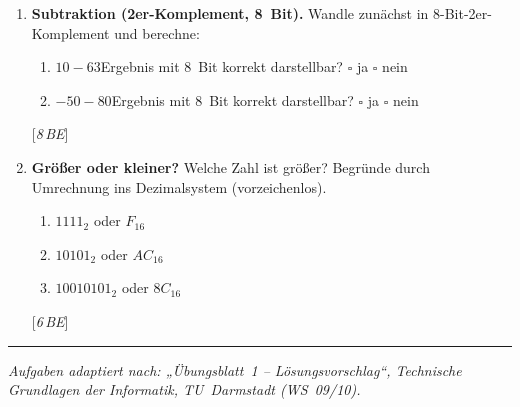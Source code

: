 \documentclass[11pt,a4paper]{scrartcl}
\newenvironment{aufgaben}{%
  \begin{enumerate}[leftmargin=*,label=\textbf{Aufgabe~\arabic*:}, itemsep=0.6em]
}{\end{enumerate}}
\newcommand{\punkte}[1]{\hfill{\small[\textit{#1\,BE}]}}
\begin{document}
\begin{aufgaben}
  \item \textbf{Subtraktion (2er-Komplement, 8~Bit).} Wandle zunächst in 8-Bit-2er-Komplement und berechne:
  \begin{enumerate}[label*=\alph*)]
    \item \(10 - 63\)\quad Ergebnis mit 8~Bit korrekt darstellbar? \(\square\) ja \(\square\) nein
    \item \(-50 - 80\)\quad Ergebnis mit 8~Bit korrekt darstellbar? \(\square\) ja \(\square\) nein
  \end{enumerate}
  \punkte{8}

  \item \textbf{Größer oder kleiner?} Welche Zahl ist größer? Begründe durch Umrechnung ins Dezimalsystem (vorzeichenlos).
  \begin{enumerate}[label*=\alph*)]
    \item \(1111_2\) \; oder \; \(F_{16}\)
    \item \(10101_2\) \; oder \; \(AC_{16}\)
    \item \(10010101_2\) \; oder \; \(8C_{16}\)
  \end{enumerate}
  \punkte{6}
\end{aufgaben}

\vfill
\hrule
\small\emph{Aufgaben adaptiert nach: „Übungsblatt~1 – Lösungsvorschlag“, Technische Grundlagen der Informatik, TU~Darmstadt (WS~09/10).}
\end{document}
